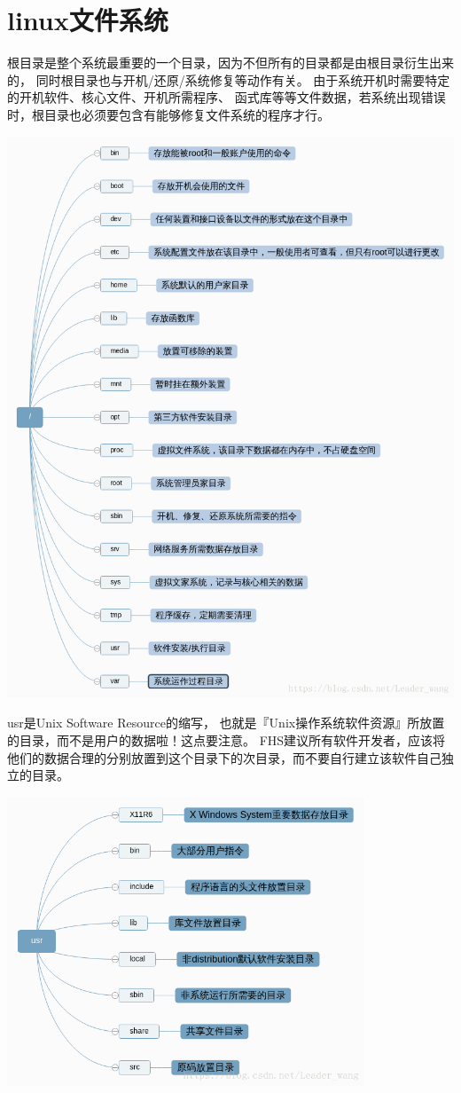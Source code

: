 \documentclass[twocolumn]{article}
\begin{document}
	\section{linux文件系统}
	
	根目录是整个系统最重要的一个目录，因为不但所有的目录都是由根目录衍生出来的， 同时根目录也与开机/还原/系统修复等动作有关。 由于系统开机时需要特定的开机软件、核心文件、开机所需程序、 函式库等等文件数据，若系统出现错误时，根目录也必须要包含有能够修复文件系统的程序才行。
	
	\includegraphics[width=\textwidth,height=0.75\textheight]{1}
	
	\newpage
	usr是Unix Software Resource的缩写， 也就是『Unix操作系统软件资源』所放置的目录，而不是用户的数据啦！这点要注意。 FHS建议所有软件开发者，应该将他们的数据合理的分别放置到这个目录下的次目录，而不要自行建立该软件自己独立的目录。
	
	\includegraphics[width=0.8\textwidth,height=0.4\textheight]{2}
	
\end{document}
